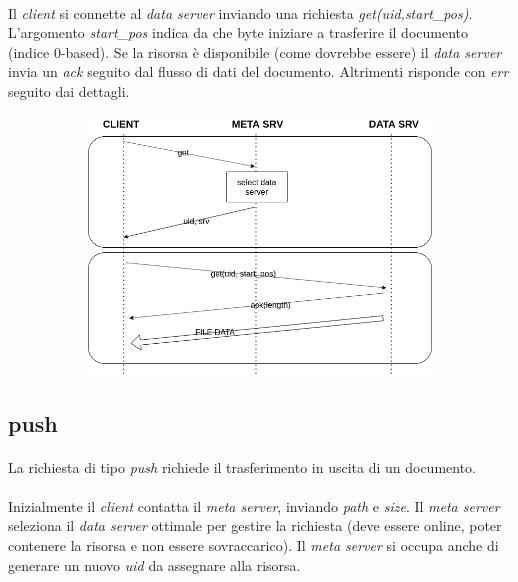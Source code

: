 \documentclass[11pt,a4paper,english]{article}
\begin{document}
\paragraph{} Il \emph{client} si connette al \emph{data server} inviando una richiesta \emph{get(uid,start\_pos)}. L'argomento \emph{start\_pos} indica da che byte iniziare a trasferire il documento (indice 0-based). Se la risorsa è disponibile (come dovrebbe essere) il \emph{data server} invia un \emph{ack} seguito dal flusso di dati del documento. Altrimenti risponde con \emph{err} seguito dai dettagli. 

\begin{figure}[H]
	\centering
	\begin{subfigure}{0.80\linewidth}
		\includegraphics[width=\linewidth]{../diagrams/requests/get_request.png}
	\end{subfigure}
\end{figure}


\subsection{push}

\paragraph{} La richiesta di tipo \emph{push} richiede il trasferimento in uscita di un documento. 

\paragraph{} Inizialmente il \emph{client} contatta il \emph{meta server}, inviando \emph{path} e \emph{size}. Il \emph{meta server} seleziona il \emph{data server} ottimale per gestire la richiesta (deve essere online, poter contenere la risorsa e non essere sovraccarico). Il \emph{meta server} si occupa anche di generare un nuovo \emph{uid} da assegnare alla risorsa. 
\end{document}
